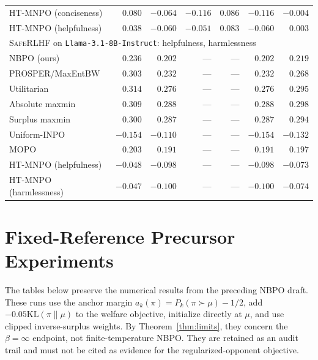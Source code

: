 \documentclass{article}
\theoremstyle{remark}
\theoremstyle{plain}
\newcommand{\KL}{\mathrm{KL}}
\newcommand{\NBPO}{\textsc{NBPO}}
\begin{document}
\begin{table}[t]
\begin{tabular}{lrrrrrr}
HT-MNPO (conciseness) & $0.080$ & $-0.064$ & $-0.116$ & $0.086$ & $-0.116$ & $-0.004$\\
HT-MNPO (helpfulness) & $0.038$ & $-0.060$ & $-0.051$ & $0.083$ & $-0.060$ & $0.003$\\
\midrule
\multicolumn{7}{l}{\textsc{SafeRLHF} on \texttt{Llama-3.1-8B-Instruct}: helpfulness, harmlessness}\\
\NBPO{} (ours) & $0.236$ & $0.202$ & --- & --- & $0.202$ & $0.219$\\
PROSPER/MaxEntBW & $0.303$ & $0.232$ & --- & --- & $0.232$ & $0.268$\\
Utilitarian & $0.314$ & $0.276$ & --- & --- & $0.276$ & $0.295$\\
Absolute maxmin & $0.309$ & $0.288$ & --- & --- & $0.288$ & $0.298$\\
Surplus maxmin & $0.300$ & $0.287$ & --- & --- & $0.287$ & $0.294$\\
Uniform-INPO & $-0.154$ & $-0.110$ & --- & --- & $-0.154$ & $-0.132$\\
MOPO & $0.203$ & $0.191$ & --- & --- & $0.191$ & $0.197$\\
HT-MNPO (helpfulness) & $-0.048$ & $-0.098$ & --- & --- & $-0.098$ & $-0.073$\\
HT-MNPO (harmlessness) & $-0.047$ & $-0.100$ & --- & --- & $-0.100$ & $-0.074$\\
\bottomrule
\end{tabular}
\end{table}


\section{Fixed-Reference Precursor Experiments}
\label{app:legacy}
The tables below preserve the numerical results from the preceding NBPO draft. These runs use the anchor margin $a_k(\pi)=P_k(\pi\succ\mu)-1/2$, add $-0.05\KL(\pi\|\mu)$ to the welfare objective, initialize directly at $\mu$, and use clipped inverse-surplus weights. By Theorem~\ref{thm:limits}, they concern the $\beta=\infty$ endpoint, not finite-temperature \NBPO{}. They are retained as an audit trail and must not be cited as evidence for the regularized-opponent objective.
\end{document}
